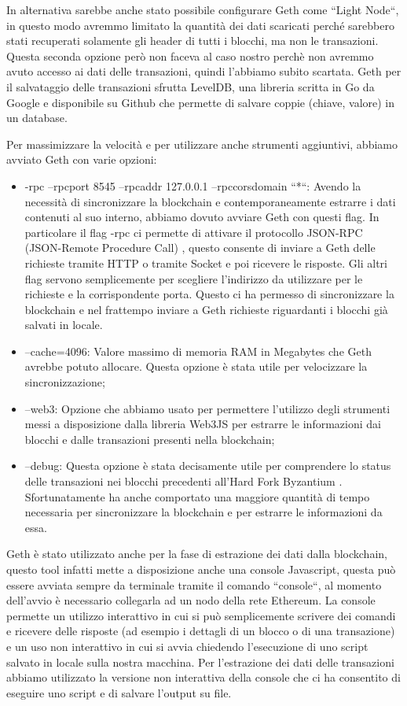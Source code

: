 \documentclass[12pt]{report}
\begin{document}
In alternativa sarebbe anche stato possibile configurare Geth come ``Light Node``, in questo modo avremmo limitato la quantità dei dati scaricati perché sarebbero stati recuperati solamente gli header di tutti i blocchi, ma non le transazioni. Questa seconda opzione però non faceva al caso nostro perchè non avremmo avuto accesso ai dati delle transazioni, quindi l'abbiamo subito scartata.
\newline Geth per il salvataggio delle transazioni sfrutta LevelDB, una libreria scritta in Go da Google e disponibile su Github \cite{LevelDB} che permette di salvare coppie (chiave, valore) in un database.

Per massimizzare la velocità e per utilizzare anche strumenti aggiuntivi, abbiamo avviato Geth con varie opzioni:
\begin{itemize}
\item -rpc --rpcport 8545 --rpcaddr 127.0.0.1 --rpccorsdomain ``*``: Avendo la necessità di sincronizzare la blockchain e contemporaneamente estrarre i dati contenuti al suo interno, abbiamo dovuto avviare Geth con questi flag. 
In particolare il flag -rpc ci permette di attivare il protocollo JSON-RPC (JSON-Remote Procedure Call) \cite{JSONRPC}, questo consente di inviare a Geth delle richieste tramite HTTP o tramite Socket e poi ricevere le risposte. Gli altri flag servono semplicemente per scegliere l'indirizzo da utilizzare per le richieste e la corrispondente porta.
Questo ci ha permesso di sincronizzare la blockchain e nel frattempo inviare a Geth richieste riguardanti i blocchi già salvati in locale.
\item --cache=4096: Valore massimo di memoria RAM in Megabytes che Geth avrebbe potuto allocare. Questa opzione è stata utile per velocizzare la sincronizzazione;
\item --web3: Opzione che abbiamo usato per permettere l'utilizzo degli strumenti messi a disposizione dalla libreria Web3JS per estrarre le informazioni dai blocchi e dalle transazioni presenti nella blockchain;
\item --debug: Questa opzione è stata decisamente utile per comprendere lo status delle transazioni nei blocchi precedenti all'Hard Fork Byzantium \cite{Byzantium}. Sfortunatamente ha anche comportato una maggiore quantità di tempo necessaria per sincronizzare la blockchain e per estrarre le informazioni da essa.
\end{itemize}

Geth è stato utilizzato anche per la fase di estrazione dei dati dalla blockchain, questo tool infatti mette a disposizione anche una console Javascript, questa può essere avviata sempre da terminale tramite il comando ``console``, al momento dell'avvio è necessario collegarla ad un nodo della rete Ethereum.
La console permette un utilizzo interattivo in cui si può semplicemente scrivere dei comandi e ricevere delle risposte (ad esempio i dettagli di un blocco o di una transazione) e un uso non interattivo in cui si avvia chiedendo l'esecuzione di uno script salvato in locale sulla nostra macchina.
Per l'estrazione dei dati delle transazioni abbiamo utilizzato la versione non interattiva della console che ci ha consentito di eseguire uno script e di salvare l'output su file.
\end{document}
